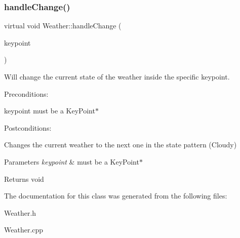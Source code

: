 \subsubsection{\texorpdfstring{handle\+Change()}{handleChange()}}
{\footnotesize\ttfamily virtual void Weather\+::handle\+Change (\begin{DoxyParamCaption}\item[{Key\+Point $\ast$}]{keypoint }\end{DoxyParamCaption})\hspace{0.3cm}{\ttfamily [pure virtual]}}



Will change the current state of the weather inside the specific keypoint. 

Preconditions\+:
\begin{DoxyItemize}
\item keypoint must be a Key\+Point$\ast$
\end{DoxyItemize}

Postconditions\+:
\begin{DoxyItemize}
\item Changes the current weather to the next one in the state pattern (Cloudy)
\end{DoxyItemize}


\begin{DoxyParams}{Parameters}
{\em keypoint} & must be a Key\+Point$\ast$ \\
\hline
\end{DoxyParams}
\begin{DoxyReturn}{Returns}
void 
\end{DoxyReturn}


The documentation for this class was generated from the following files\+:\begin{DoxyCompactItemize}
\item 
Weather.\+h\item 
Weather.\+cpp\end{DoxyCompactItemize}

